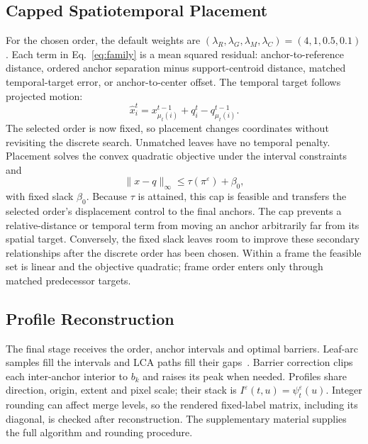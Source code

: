\subsection{Capped Spatiotemporal Placement}
For the chosen order, the default weights are $(\lambda_R,\lambda_G,\lambda_M,\lambda_C)=(4,1,0.5,0.1)$. Each term in Eq.~\ref{eq:family} is a mean squared residual: anchor-to-reference distance, ordered anchor separation minus support-centroid distance, matched temporal-target error, or anchor-to-center offset. The temporal target follows projected motion:
\begin{equation}\label{eq:temporal_target}
\hat x_i^t=x_{\mu_t(i)}^{t-1}+q_i^t-q_{\mu_t(i)}^{t-1}.
\end{equation}
The selected order is now fixed, so placement changes coordinates without revisiting the discrete search. Unmatched leaves have no temporal penalty. Placement solves the convex quadratic objective under the interval constraints and
\begin{equation}\label{eq:qp}
\|x-q\|_\infty\le\tau(\pi^\varepsilon)+\beta_0,
\end{equation}
with fixed slack $\beta_0$. Because $\tau$ is attained, this cap is feasible and transfers the selected order's displacement control to the final anchors. The cap prevents a relative-distance or temporal term from moving an anchor arbitrarily far from its spatial target. Conversely, the fixed slack leaves room to improve these secondary relationships after the discrete order has been chosen. Within a frame the feasible set is linear and the objective quadratic; frame order enters only through matched predecessor targets.

\subsection{Profile Reconstruction}
The final stage receives the order, anchor intervals and optimal barriers. Leaf-arc samples fill the intervals and LCA paths fill their gaps~\cite{Koepp:2023:TMTM,STMTM:2026}. Barrier correction clips each inter-anchor interior to $b_k$ and raises its peak when needed. Profiles share direction, origin, extent and pixel scale; their stack is $I^\varepsilon(t,u)=\psi_t^\varepsilon(u)$. Integer rounding can affect merge levels, so the rendered fixed-label matrix, including its diagonal, is checked after reconstruction. The supplementary material supplies the full algorithm and rounding procedure.
